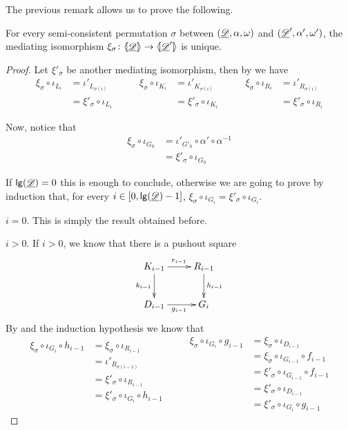 The previous remark allows us to prove the following.

\begin{lemma}\label{prop:isouno} For every semi-consistent permutation $\sigma$ between  $(\underline{\mathscr{D}}, \alpha, \omega)$ and $(\underline{\mathscr{D}}', \alpha', \omega')$, the mediating isomorphism $\xi_\sigma\colon \langle \hspace{-1.85pt}[ \underline{\mathscr{D}}]\hspace{-1.85pt}\rangle\to \langle \hspace{-1.85pt}[ \underline{\mathscr{D}}']\hspace{-1.85pt}\rangle$ is unique.
\end{lemma}
\begin{proof} Let $\xi'_\sigma$ be another mediating isomorphism, then by  we have
	\[\begin{split}
		\xi_\sigma \circ \iota_{L_i}&=\iota'_{L_{\sigma(i)}}\\&=\xi'_\sigma\circ \iota_{L_i}
	\end{split} \qquad \begin{split}
		\xi_\sigma \circ \iota_{K_i}&=\iota'_{K_{\sigma(i)}}\\&=\xi'_\sigma\circ \iota_{K_i}
	\end{split} \qquad \begin{split}
		\xi_\sigma \circ \iota_{R_i}&=\iota'_{R_{\sigma(i)}}\\&=\xi'_\sigma\circ \iota_{R_i}
	\end{split}\]
	
	Now, notice that 
	\begin{align*}
		\xi_\sigma \circ \iota_{G_0}&=\iota'_{G'_0}\circ \alpha'\circ \alpha^{-1}\\&=\xi'_\sigma \circ \iota_{G_0}
	\end{align*}
	
	If $\mathsf{lg}(\underline{\mathscr{D}})=0$ this is enough to conclude, otherwise we are going to prove by induction that, for every $i\in [0, \mathsf{lg}(\underline{\mathscr{D}})-1]$, $\xi_\sigma \circ \iota_{G_i}=\xi'_\sigma\circ \iota_{G_i}$.
	
	\smallskip \noindent $i=0$. This is simply the result obtained before.
	
	\smallskip \noindent $i >0$. If $i>0$, we know that there is a pushout square
	\[\xymatrix{K_{i-1}\ar[r]^{r_{i-1}} \ar[d]_{k_{i-1}}& R_{i-1} \ar[d]^{h_{i-1}}\\ D_{i-1} \ar[r]_{g_{i-1}}& G_i}\] 
	By  and the induction hypothesis we know that
	\[\begin{split}
		\xi_\sigma \circ \iota_{G_i}\circ h_{i-1}&=  \xi_\sigma\circ \iota_{R_{i-1}}\\&=\iota'_{R_{\sigma(i-1)}}\\&=\xi'_{\sigma}\circ \iota_{R_{i-1}}\\&=\xi'_{\sigma} \circ \iota_{G_i}\circ h_{i-1}\\&
	\end{split} \qquad
	\begin{split}
		\xi_\sigma \circ \iota_{G_i}\circ g_{i-1}&=\xi_{\sigma}\circ \iota_{D_{i-1}}\\&=\xi_{\sigma}\circ \iota_{G_{i-1}} \circ f_{i-1}\\&=\xi'_{\sigma}\circ \iota_{G_{i-1}} \circ f_{i-1}\\&=\xi'_{\sigma}\circ \iota_{D_{i-1}} \\&=\xi'_{\sigma}\circ \iota_{G_{i}} \circ g_{i-1}
	\end{split}
	\]
	

\end{proof}
